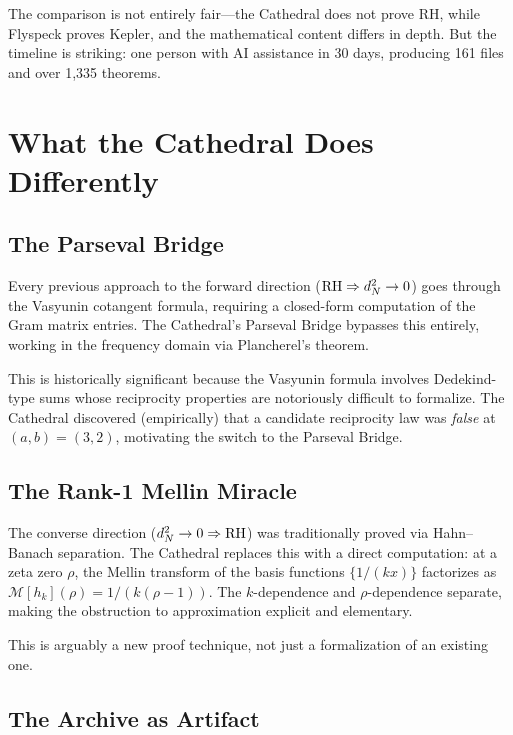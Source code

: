 \documentclass[11pt,a4paper]{article}
\begin{document}
The comparison is not entirely fair---the Cathedral does not prove
RH, while Flyspeck proves Kepler, and the mathematical content
differs in depth. But the timeline is striking: one person with AI
assistance in 30 days, producing 161 files and over 1,335 theorems.

\section{What the Cathedral Does Differently}

\subsection{The Parseval Bridge}

Every previous approach to the forward direction
($\mathrm{RH} \Rightarrow d_N^2 \to 0$) goes through the Vasyunin
cotangent formula, requiring a closed-form computation of the
Gram matrix entries. The Cathedral's Parseval Bridge bypasses this
entirely, working in the frequency domain via Plancherel's theorem.

This is historically significant because the Vasyunin formula
involves Dedekind-type sums whose reciprocity properties are
notoriously difficult to formalize. The Cathedral discovered
(empirically) that a candidate reciprocity law was \emph{false}
at $(a,b) = (3,2)$, motivating the switch to the Parseval Bridge.

\subsection{The Rank-1 Mellin Miracle}

The converse direction ($d_N^2 \to 0 \Rightarrow \mathrm{RH}$) was
traditionally proved via Hahn--Banach separation. The Cathedral
replaces this with a direct computation: at a zeta zero $\rho$,
the Mellin transform of the basis functions $\{1/(kx)\}$
factorizes as $\mathcal{M}[h_k](\rho) = 1/(k(\rho-1))$. The
$k$-dependence and $\rho$-dependence separate, making the
obstruction to approximation explicit and elementary.

This is arguably a new proof technique, not just a formalization
of an existing one.

\subsection{The Archive as Artifact}
\end{document}
